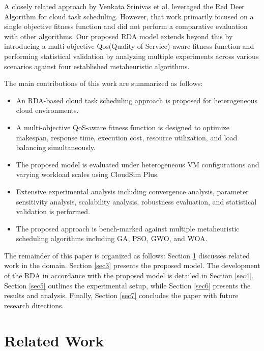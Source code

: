 \documentclass[pdflatex,sn-mathphys-num]{sn-jnl}%
\begin{document}
A closely related approach by Venkata Srinivas et al. \cite{VenkataSrinivas2023_RDA} leveraged the Red Deer Algorithm for cloud task scheduling. However, that work primarily focused on a single objective fitness function and did not perform a comparative evaluation with other algorithms. Our proposed RDA model extends beyond this by introducing a multi objective Qos(Quality of Service) aware fitness function and performing  statistical validation by analyzing multiple experiments across various scenarios against four established metaheuristic algorithms.

\singlespacing \noindent The main contributions of this work are summarized as follows:

\begin{itemize}
\item An RDA-based cloud task scheduling approach is proposed for heterogeneous cloud environments.
\item A multi-objective QoS-aware fitness function is designed to optimize makespan, response time, execution cost, resource utilization, and load balancing simultaneously.
\item The proposed model is evaluated under heterogeneous VM configurations and varying workload scales using CloudSim Plus.
\item Extensive experimental analysis including convergence analysis, parameter sensitivity analysis, scalability analysis, robustness evaluation, and statistical validation is performed.
\item The proposed approach is bench-marked against multiple metaheuristic scheduling algorithms including GA, PSO, GWO, and WOA.
\end{itemize}

The remainder of this paper is organized as follows: Section \ref{sec2} discusses related work in the domain. Section \ref{sec3} presents the proposed model. The development of the RDA in accordance with the proposed model is detailed in Section \ref{sec4}. Section \ref{sec5} outlines the experimental setup, while Section \ref{sec6} presents the results and analysis. Finally, Section \ref{sec7} concludes the paper with future research directions.

\FloatBarrier
\section{Related Work}\label{sec2}
\end{document}
